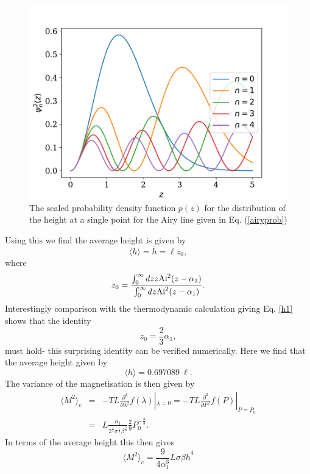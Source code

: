  \begin{figure}[t]
\begin{center}
\includegraphics[angle=0,width=15cm ]{finite-size/etats-laser.pdf}
\caption{The scaled probability density function $p(z)$ for the distribution of the height at
a single point for the Airy line given in Eq. (\ref{airyprob})}
\label{1dpot}
\end{center}
\end{figure}
Using this we find the average height is given by
\begin{equation}
\langle h\rangle = \overline h= \ell z_0,
\end{equation}
where 
\begin{equation}
z_0 = \frac{\int_0^\infty dz z {\rm Ai}^2(z-\alpha_1)}{\int_0^\infty dz {\rm Ai}^2(z-\alpha_1)}.
\end{equation}
Interestingly comparison with the thermodynamic calculation giving Eq. \eqref{h1} shows that the identity
\begin{equation}
z_0 = \frac{2}{3}\alpha_1,
\end{equation}
must hold- this surprising identity can be verified numerically. Here we find that the average height given by
\begin{equation}
\langle h\rangle= 0.697089 \ \ell.
\end{equation}
The variance of the magnetisation is then given by
\begin{eqnarray}
\langle M^2\rangle_c &=& -TL\frac{\partial^2}{\partial \lambda^2}f (\lambda)|_{\lambda=0}=-TL\frac{\partial^2}{\partial P^2}f (P)|_{P=P_0}\\
&=& L\frac{\alpha_1 }{2^\frac{1}{3} \sigma^\frac{1}{3}\beta^\frac{5}{3}}\frac{2}{9}P_0^{-\frac{4}{3}}.
\end{eqnarray}
In terms of the average height this then gives
\begin{equation}
\langle M^2\rangle_c = \frac{9}{4\alpha_1^3}L\sigma\beta \overline h^4
\end{equation}


